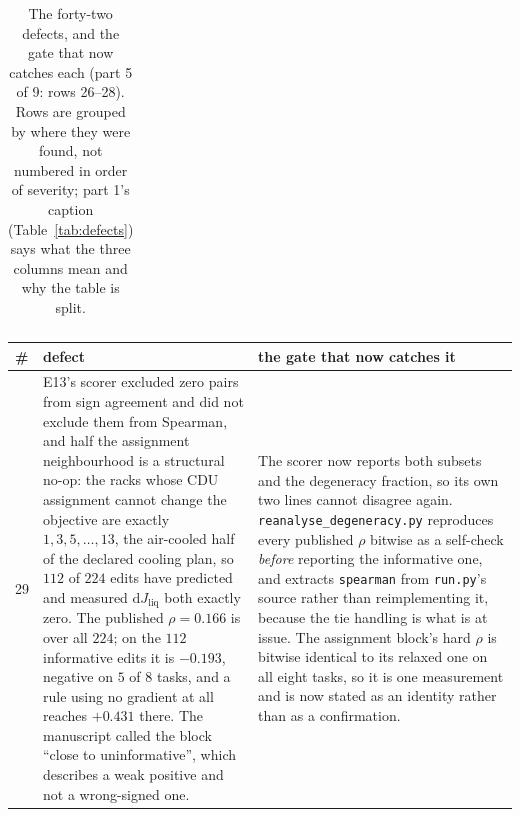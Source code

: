 \documentclass{article}
\newcommand{\Jliq}{J_{\mathrm{liq}}}
\begin{document}
\begin{table}[p]
\begin{tabular}{@{}p{0.6cm}p{7.3cm}p{7.3cm}@{}}
\bottomrule
\end{tabular}
\caption{The forty-two defects, and the gate that now catches each (part 5 of 9: rows 26--28).  Rows are grouped by where they were found, not numbered in order of severity; part 1's caption (Table~\ref{tab:defects}) says what the three columns mean and why the table is split.}
\label{tab:defectse}
\end{table}

\begin{table}[p]
\centering
\small\sloppy
\setlength{\tabcolsep}{4pt}
\begin{tabular}{@{}p{0.6cm}p{7.3cm}p{7.3cm}@{}}
\toprule
\# & defect & the gate that now catches it \\
\midrule
29 & E13's scorer excluded zero pairs from sign agreement and did not exclude them from Spearman, and half the assignment neighbourhood is a structural no-op: the racks whose CDU assignment cannot change the objective are exactly $1,3,5,\dots,13$, the air-cooled half of the declared cooling plan, so $112$ of $224$ edits have predicted and measured $\mathrm{d}\Jliq$ both exactly zero.  The published $\rho = 0.166$ is over all $224$; on the $112$ informative edits it is $-0.193$, negative on $5$ of $8$ tasks, and a rule using no gradient at all reaches $+0.431$ there.  The manuscript called the block ``close to uninformative'', which describes a weak positive and not a wrong-signed one. & The scorer now reports both subsets and the degeneracy fraction, so its own two lines cannot disagree again.  \texttt{reanalyse\_degeneracy.py} reproduces every published $\rho$ bitwise as a self-check \emph{before} reporting the informative one, and extracts \texttt{spearman} from \texttt{run.py}'s source rather than reimplementing it, because the tie handling is what is at issue.  The assignment block's hard $\rho$ is bitwise identical to its relaxed one on all eight tasks, so it is one measurement and is now stated as an identity rather than as a confirmation. \\

\end{tabular}
\end{table}
\end{document}

